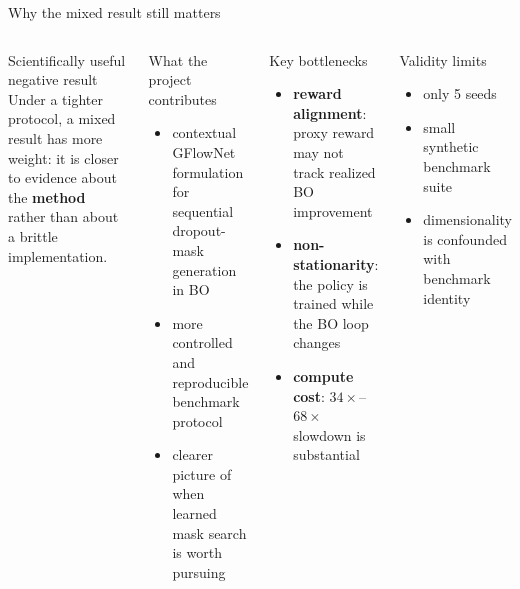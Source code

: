 \documentclass[aspectratio=169]{beamer}
\begin{document}
\begin{frame}{Why the mixed result still matters}
\vspace{-0.55em}
\begin{columns}[T,onlytextwidth]
\begin{minipage}[t][0.80\textheight]{\linewidth}\vspace{0pt}
  \begin{cardA}{Scientifically useful negative result}
  Under a tighter protocol, a mixed result has more weight: it is closer to evidence about the \textbf{method} rather than about a brittle implementation.
  \end{cardA}

  \vfill

  \begin{card}{What the project contributes}
  \begin{itemize}
    \item contextual GFlowNet formulation for sequential dropout-mask generation in BO
    \item more controlled and reproducible benchmark protocol
    \item clearer picture of when learned mask search is worth pursuing
  \end{itemize}
  \end{card}
\end{minipage}

\begin{minipage}[t][0.80\textheight]{\linewidth}\vspace{0pt}
  \begin{cardW}{Key bottlenecks}
  \begin{itemize}
    \item \textbf{reward alignment}: proxy reward may not track realized BO improvement
    \item \textbf{non-stationarity}: the policy is trained while the BO loop changes
    \item \textbf{compute cost}: $34\times$--$68\times$ slowdown is substantial
  \end{itemize}
  \end{cardW}

  \vfill

  \begin{card}{Validity limits}
  \begin{itemize}
    \item only 5 seeds
    \item small synthetic benchmark suite
    \item dimensionality is confounded with benchmark identity
  \end{itemize}
  \end{card}
\end{minipage}
\end{columns}
\end{frame}
\end{document}
